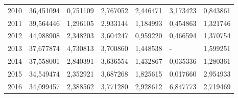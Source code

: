 \begin{table}
\begin{tabular}{p{1cm}p{2cm}p{2cm}p{2cm}p{2cm}p{2cm}p{2cm}}
 2010 &           36,451094 &                        0,751109 &                 2,767052 &                            2,446471 &                3,173423 &                0,843861 \\
 2011 &           39,564446 &                        1,296105 &                 2,933144 &                            1,184993 &                0,454863 &                1,321746 \\
 2012 &           44,988908 &                        2,348203 &                 3,604247 &                            0,959220 &                0,466594 &                1,370754 \\
 2013 &           37,677874 &                        4,730813 &                 3,700860 &                            1,448538 &                       - &                1,599251 \\
 2014 &           37,558001 &                        2,840391 &                 3,636554 &                            1,432867 &                0,035336 &                1,280361 \\
 2015 &           34,549474 &                        2,352921 &                 3,687268 &                            1,825615 &                0,017660 &                2,954933 \\
 2016 &           34,099457 &                        2,388562 &                 3,771280 &                            2,928612 &                6,847773 &                2,719469 \\
\bottomrule
\end{tabular}
\end{table}
